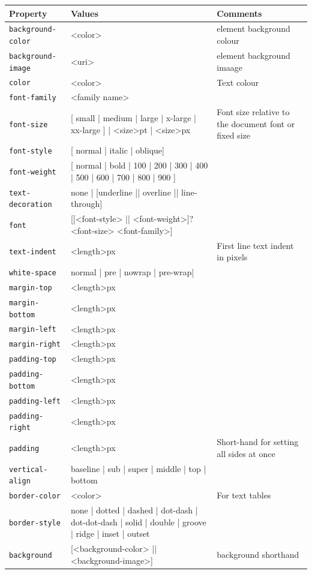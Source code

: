 \documentclass[a4paper,10pt]{book}
\begin{document}
\begin{tabular}{p{3.1cm} p{6cm} p{4.5cm}}
\hline
\textbf{Property} & \textbf{Values} & \textbf{Comments} \\
\hline
\verb|background-color| & <color> & element background colour \\
\verb|background-image| & <uri> & element background imaage \\
\verb|color| & <color> & Text colour \\
\verb|font-family| & <family name> & \\
\verb|font-size| & [ small | medium | large | x-large | xx-large ] | <size>pt | <size>px & Font size relative to the document font or fixed size \\
\verb|font-style| & [ normal | italic | oblique] & \\
\verb|font-weight| & [ normal | bold | 100 | 200 | 300 | 400 | 500 | 600 | 700 | 800 | 900 ] & \\
\verb|text-decoration| & none | [underline || overline || line-through] & \\
\verb|font| & [[<font-style> || <font-weight>]? <font-size> <font-family>] & \\
\verb|text-indent| & <length>px & First line text indent in pixels\\
\verb|white-space| & normal | pre | nowrap | pre-wrap| & \\
\verb|margin-top| & <length>px & \\
\verb|margin-bottom| & <length>px & \\
\verb|margin-left| & <length>px & \\
\verb|margin-right| & <length>px & \\
\verb|padding-top| & <length>px & \\
\verb|padding-bottom| & <length>px & \\
\verb|padding-left| & <length>px & \\
\verb|padding-right| & <length>px & \\
\verb|padding| & <length>px & Short-hand for setting all sides at once\\
\verb|vertical-align| & baseline | sub | super | middle | top | bottom & \\
\verb|border-color| & <color> & For text tables\\

\verb|border-style| & none | dotted | dashed | dot-dash | dot-dot-dash | solid | double | groove | ridge | inset | outset & \\
\verb|background| & [<background-color> || <background-image>] & background shorthand\\
\hline
\end{tabular}
\end{document}
